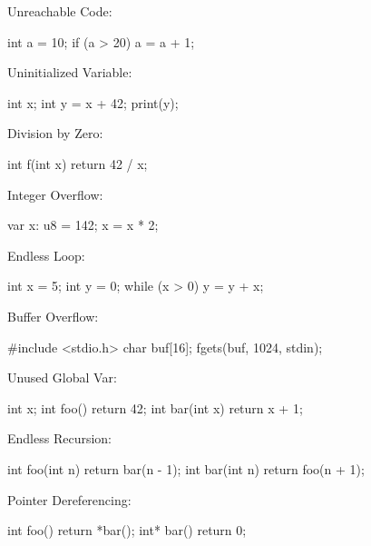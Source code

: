 \documentclass{article}
\begin{document}
\begin{pptWide}{3}
Unreachable Code:
{\small\begin{ffcode}
int a = 10;
if (a > 20) {
  a = a + 1;
}
\end{ffcode}
}\par
Uninitialized Variable:\par
{\small\begin{ffcode}
int x;
int y = x + 42;
print(y);
\end{ffcode}
}
\par\columnbreak\par
Division by Zero:\par
{\small\begin{ffcode}
int f(int x) {
  return 42 / x;
}
\end{ffcode}
}\par
Integer Overflow:\par
{\small\begin{ffcode}
var x: u8 = 142;
x = x * 2;
\end{ffcode}
}
\par\columnbreak\par
Endless Loop:
{\small\begin{ffcode}
int x = 5;
int y = 0;
while (x > 0) {
  y = y + x;
}
\end{ffcode}
}\par
Buffer Overflow:
{\small\begin{ffcode}
#include <stdio.h>
char buf[16];
fgets(buf, 1024, stdin);
\end{ffcode}
}
\end{pptWide}
\plush{}

\begin{pptWide}{3}
Unused Global Var:
{\small\begin{ffcode}
int x;
int foo() {
  return 42;
}
int bar(int x) {
  return x + 1;
}
\end{ffcode}
}
\par\columnbreak\par
Endless Recursion:\par
{\small\begin{ffcode}
int foo(int n) {
  return bar(n - 1);
}
int bar(int n) {
  return foo(n + 1);
}
\end{ffcode}
}
\par\columnbreak\par
Pointer Dereferencing:
{\small\begin{ffcode}
int foo() {
  return *bar();
}
int* bar() {
  return 0;
}
\end{ffcode}
}
\end{pptWide}
\plush{}
\end{document}
